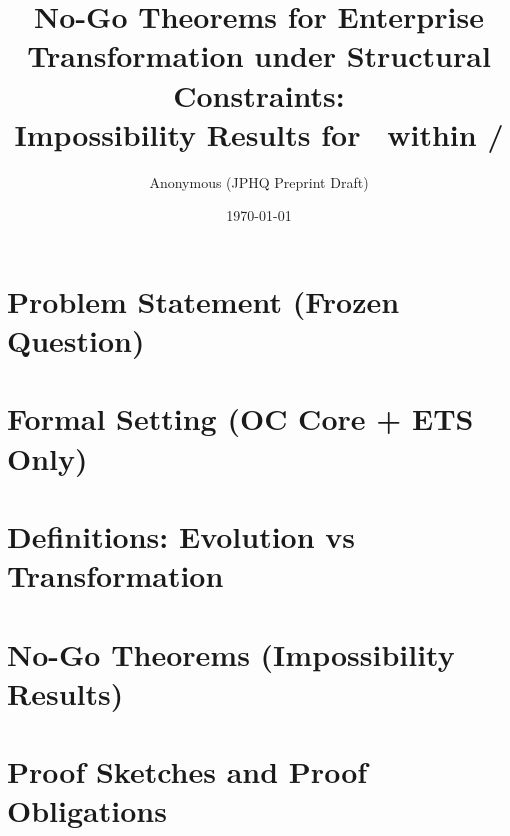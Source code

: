 ﻿\documentclass[11pt]{article}
\title{No-Go Theorems for Enterprise Transformation under Structural Constraints:\\
Impossibility Results for \KEA\ within \OC/\kw{ETS.K\_EA.v1.1}}
\author{Anonymous (JPHQ Preprint Draft)}
\date{\today}
\theoremstyle{plain}
\theoremstyle{definition}
\theoremstyle{remark}
\begin{document}
\maketitle



\section{Problem Statement (Frozen Question)}


\section{Formal Setting (OC Core + ETS Only)}


\section{Definitions: Evolution vs Transformation}


\section{No-Go Theorems (Impossibility Results)}


\section{Proof Sketches and Proof Obligations}

\end{document}
